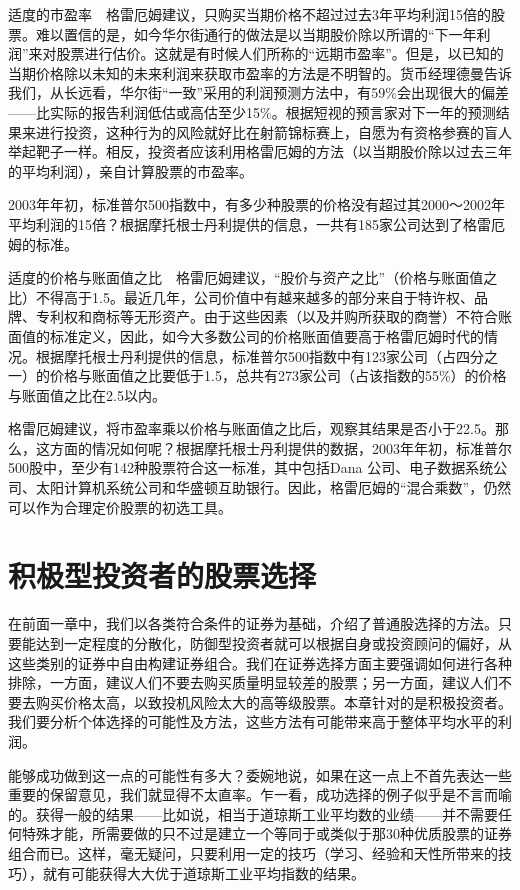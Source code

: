 \documentclass[12pt,oneside]{book}
\begin{document}
适度的市盈率　格雷厄姆建议，只购买当期价格不超过过去3年平均利润15倍的股票。难以置信的是，如今华尔街通行的做法是以当期股价除以所谓的“下一年利润”来对股票进行估价。这就是有时候人们所称的“远期市盈率”。但是，以已知的当期价格除以未知的未来利润来获取市盈率的方法是不明智的。货币经理德曼告诉我们，从长远看，华尔街“一致”采用的利润预测方法中，有59\%会出现很大的偏差——比实际的报告利润低估或高估至少15\%。根据短视的预言家对下一年的预测结果来进行投资，这种行为的风险就好比在射箭锦标赛上，自愿为有资格参赛的盲人举起靶子一样。相反，投资者应该利用格雷厄姆的方法（以当期股价除以过去三年的平均利润），亲自计算股票的市盈率。

2003年年初，标准普尔500指数中，有多少种股票的价格没有超过其2000～2002年平均利润的15倍？根据摩托根士丹利提供的信息，一共有185家公司达到了格雷厄姆的标准。

适度的价格与账面值之比　格雷厄姆建议，“股价与资产之比”（价格与账面值之比）不得高于1.5。最近几年，公司价值中有越来越多的部分来自于特许权、品牌、专利权和商标等无形资产。由于这些因素（以及并购所获取的商誉）不符合账面值的标准定义，因此，如今大多数公司的价格账面值要高于格雷厄姆时代的情况。根据摩托根士丹利提供的信息，标准普尔500指数中有123家公司（占四分之一）的价格与账面值之比要低于1.5，总共有273家公司（占该指数的55\%）的价格与账面值之比在2.5以内。

格雷厄姆建议，将市盈率乘以价格与账面值之比后，观察其结果是否小于22.5。那么，这方面的情况如何呢？根据摩托根士丹利提供的数据，2003年年初，标准普尔500股中，至少有142种股票符合这一标准，其中包括Dana 公司、电子数据系统公司、太阳计算机系统公司和华盛顿互助银行。因此，格雷厄姆的“混合乘数”，仍然可以作为合理定价股票的初选工具。

\section{积极型投资者的股票选择}
在前面一章中，我们以各类符合条件的证券为基础，介绍了普通股选择的方法。只要能达到一定程度的分散化，防御型投资者就可以根据自身或投资顾问的偏好，从这些类别的证券中自由构建证券组合。我们在证券选择方面主要强调如何进行各种排除，一方面，建议人们不要去购买质量明显较差的股票；另一方面，建议人们不要去购买价格太高，以致投机风险太大的高等级股票。本章针对的是积极投资者。我们要分析个体选择的可能性及方法，这些方法有可能带来高于整体平均水平的利润。

能够成功做到这一点的可能性有多大？委婉地说，如果在这一点上不首先表达一些重要的保留意见，我们就显得不太直率。乍一看，成功选择的例子似乎是不言而喻的。获得一般的结果——比如说，相当于道琼斯工业平均数的业绩——并不需要任何特殊才能，所需要做的只不过是建立一个等同于或类似于那30种优质股票的证券组合而已。这样，毫无疑问，只要利用一定的技巧（学习、经验和天性所带来的技巧），就有可能获得大大优于道琼斯工业平均指数的结果。
\end{document}

